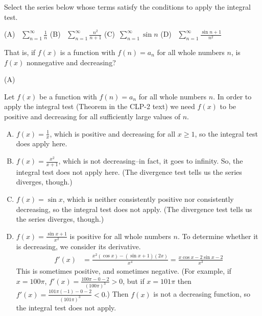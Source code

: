 \begin{Mquestion}
Select the series below whose terms satisfy the conditions to apply the integral test.

\hfill(A)~ $\displaystyle\sum_{n=1}^\infty \frac{1}{n}$ \hfill
\hfill(B)~ $\displaystyle\sum_{n=1}^\infty \frac{n^2}{n+1}$
\hfill (C)~$\displaystyle\sum_{n=1}^\infty \sin n$
\hfill(D)~ $\displaystyle\sum_{n=1}^\infty \frac{\sin n+1}{n^2}$\hfill~
\end{Mquestion}
\begin{hint}
That is, if $f(x)$ is a function with $f(n)=a_n$ for all whole numbers $n$, is $f(x)$ nonnegative and decreasing?
\end{hint}
\begin{answer}
(A)
\end{answer}
\begin{solution}
Let $f(x)$ be a function with $f(n)=a_n$ for all whole numbers $n$.
In order to apply the integral test (Theorem 
 in the CLP-2 text) we need $f(x)$ to be positive and decreasing for all sufficiently large values of $n$.
\begin{enumerate}[(A)]
\item $f(x) = \frac{1}{x}$, which is positive and decreasing for all $x \ge 1$, so the integral test does apply here.
\item $f(x)=\frac{x^2}{x+1}$, which is not decreasing--in fact, it goes to infinity. So, the integral test does not apply here. (The divergence test tells us the series diverges, though.)
\item $f(x) = \sin x$, which is neither consistently positive nor consistently decreasing, so the integral test does not apply. (The divergence test tells us the series diverges, though.)
\item $f(x)=\frac{\sin x+1}{x^2}$ is positive for all whole numbers $n$. To determine whether it is decreasing, we consider its derivative.
\begin{align*}
f'(x)&=\frac{x^2(\cos x)-(\sin x+1)(2x)}{x^4}=\frac{x\cos x - 2\sin x -2}{x^3}
\end{align*}
This is sometimes positive, and sometimes negative. (For example, if $x=100\pi$, $f'(x) = \frac{100\pi-0-2}{(100\pi)^3}>0$, but if $x=101\pi$ then $f'(x)=\frac{101\pi(-1)-0-2}{(101\pi)^3}<0$.) Then $f(x)$ is not a decreasing function, so the integral test does not apply.
\end{enumerate}
\end{solution}

